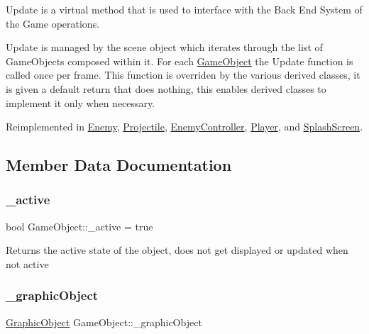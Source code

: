 Update is a virtual method that is used to interface with the Back End System of the Game operations. 

Update is managed by the scene object which iterates through the list of Game\+Objects composed within it. For each \hyperlink{class_game_object}{Game\+Object} the Update function is called once per frame. This function is overriden by the various derived classes, it is given a default return that does nothing, this enables derived classes to implement it only when necessary. 

Reimplemented in \hyperlink{class_enemy_a614ad271f07ecf63cb3e665155b7e258}{Enemy}, \hyperlink{class_projectile_a1f9df5dd65fed410d4e897eb63edc1c9}{Projectile}, \hyperlink{class_enemy_controller_af36ec67442d30c7519581b83ad6c00db}{Enemy\+Controller}, \hyperlink{class_player_a5e17be3418fa0ac0192c05efaf3dc8bd}{Player}, and \hyperlink{class_splash_screen_af78b8eab226a89fec389e53cbf3ed9e8}{Splash\+Screen}.



\subsection{Member Data Documentation}
\mbox{\label{class_game_object_aef11019578aad93f96240b79a1141a07}} 
\subsubsection{\texorpdfstring{\+\_\+active}{\_active}}
{\footnotesize\ttfamily bool Game\+Object\+::\+\_\+active = true\hspace{0.3cm}{\ttfamily [protected]}}

Returns the active state of the object, does not get displayed or updated when not active \mbox{\label{class_game_object_a07c043ba60b622f256ed18dfb46c0410}} 
\subsubsection{\texorpdfstring{\+\_\+graphic\+Object}{\_graphicObject}}
{\footnotesize\ttfamily \hyperlink{class_graphic_object}{Graphic\+Object} Game\+Object\+::\+\_\+graphic\+Object\hspace{0.3cm}{\ttfamily [protected]}}

